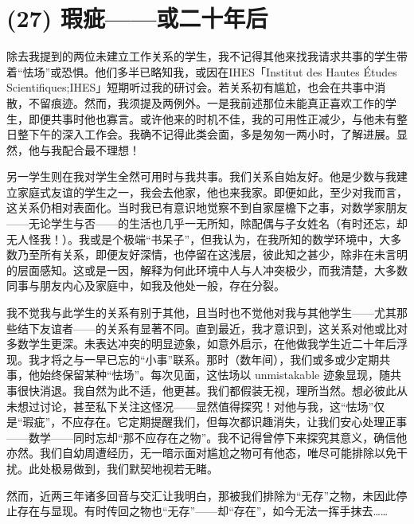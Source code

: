 \section{(27) 瑕疵——或二十年后}

除去我提到的两位未建立工作关系的学生，我不记得其他来找我请求共事的学生带着“怯场”或恐惧。他们多半已略知我，或因在IHES「Institut des Hautes Études Scientifiques;IHES」短期听过我的研讨会。若关系初有尴尬，也会在共事中消散，不留痕迹。然而，我须提及两例外。一是我前述那位未能真正喜欢工作的学生，即便共事时他也寡言。或许他来的时机不佳，我的可用性正减少，与他未有整日整下午的深入工作会。我确不记得此类会面，多是匆匆一两小时，了解进展。显然，他与我配合最不理想！

另一学生则在我对学生全然可用时与我共事。我们关系自始友好。他是少数与我建立家庭式友谊的学生之一，我会去他家，他也来我家。即便如此，至少对我而言，这关系仍相对表面化。当时我已有意识地觉察不到自家屋檐下之事，对数学家朋友——无论学生与否——的生活也几乎一无所知，除配偶与子女姓名（有时还忘，却无人怪我！）。我或是个极端“书呆子”，但我认为，在我所知的数学环境中，大多数乃至所有关系，即便友好深情，也停留在这浅层，彼此知之甚少，除非在未言明的层面感知。这或是一因，解释为何此环境中人与人冲突极少，而我清楚，大多数同事与朋友内心及家庭中，如我及他处一般，存在分裂。

我不觉我与此学生的关系有别于其他，且当时也不觉他对我与其他学生——尤其那些结下友谊者——的关系有显著不同。直到最近，我才意识到，这关系对他或比对多数学生更深。未表达冲突的明显迹象，如意外启示，在他做我学生近二十年后浮现。我才将之与一早已忘的“小事”联系。那时（数年间），我们或多或少定期共事，他始终保留某种“怯场”。每次见面，这怯场以 unmistakable 迹象显现，随共事很快消退。我自然为此不适，他更甚。我们都假装无视，理所当然。想必彼此从未想过讨论，甚至私下关注这怪况——显然值得探究！对他与我，这“怯场”仅是“瑕疵”，不应存在。它定期提醒我们，但每次都识趣消失，让我们安心处理正事——数学——同时忘却“那不应存在之物”。我不记得曾停下来探究其意义，确信他亦然。我们自幼周遭经历，无一暗示面对尴尬之物可有他态，唯尽可能排除以免干扰。此处极易做到，我们默契地视若无睹。

然而，近两三年诸多回音与交汇让我明白，那被我们排除为“无存”之物，未因此停止存在与显现。有时传回之物也“无存”——却“存在”，如今无法一挥手抹去……